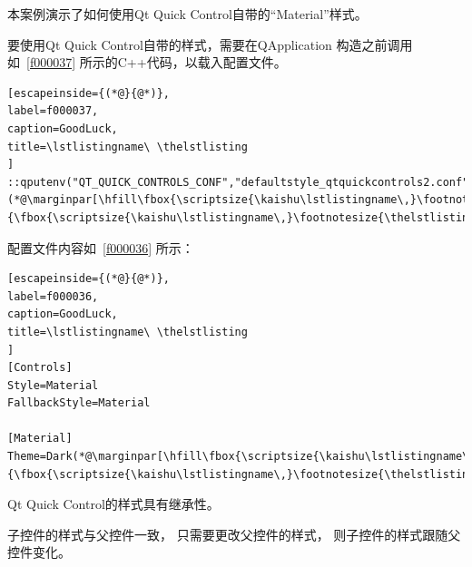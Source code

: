 本案例演示了如何使用Qt Quick Control自带的“Material”样式。

要使用Qt Quick Control自带的样式，需要在QApplication
构造之前调用如\lstlistingname\ \ref{f000037}
所示的C{\sourcefonttwo{}+}{\sourcefonttwo{}+}代码，以载入配置文件。

\FloatBarrier
\begin{lstlisting}[escapeinside={(*@}{@*)},
label=f000037,
caption=GoodLuck,
title=\lstlistingname\ \thelstlisting
]
::qputenv("QT_QUICK_CONTROLS_CONF","defaultstyle_qtquickcontrols2.conf");(*@\marginpar[\hfill\fbox{\scriptsize{\kaishu\lstlistingname\,}\footnotesize{\thelstlisting}}]{\fbox{\scriptsize{\kaishu\lstlistingname\,}\footnotesize{\thelstlisting}}}@*)\end{lstlisting}          %


配置文件内容如\lstlistingname\ \ref{f000036}
所示：
\FloatBarrier
\begin{lstlisting}[escapeinside={(*@}{@*)},
label=f000036,
caption=GoodLuck,
title=\lstlistingname\ \thelstlisting
]
[Controls]
Style=Material
FallbackStyle=Material

[Material]
Theme=Dark(*@\marginpar[\hfill\fbox{\scriptsize{\kaishu\lstlistingname\,}\footnotesize{\thelstlisting}}]{\fbox{\scriptsize{\kaishu\lstlistingname\,}\footnotesize{\thelstlisting}}}@*)\end{lstlisting}          %

Qt Quick Control的样式具有继承性。

子控件的样式与父控件一致，
只需要更改父控件的样式，
则子控件的样式跟随父控件变化。















